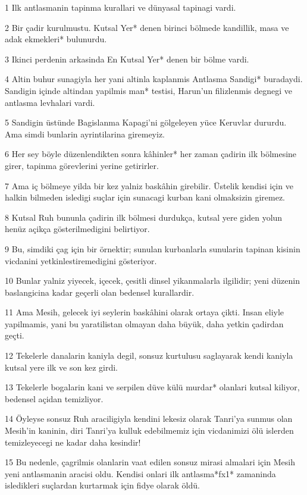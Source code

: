 \par 1 Ilk antlasmanin tapinma kurallari ve dünyasal tapinagi vardi.
\par 2 Bir çadir kurulmustu. Kutsal Yer* denen birinci bölmede kandillik, masa ve adak ekmekleri* bulunurdu.
\par 3 Ikinci perdenin arkasinda En Kutsal Yer* denen bir bölme vardi.
\par 4 Altin buhur sunagiyla her yani altinla kaplanmis Antlasma Sandigi* buradaydi. Sandigin içinde altindan yapilmis man* testisi, Harun'un filizlenmis degnegi ve antlasma levhalari vardi.
\par 5 Sandigin üstünde Bagislanma Kapagi'ni gölgeleyen yüce Keruvlar dururdu. Ama simdi bunlarin ayrintilarina giremeyiz.
\par 6 Her sey böyle düzenlendikten sonra kâhinler* her zaman çadirin ilk bölmesine girer, tapinma görevlerini yerine getirirler.
\par 7 Ama iç bölmeye yilda bir kez yalniz baskâhin girebilir. Üstelik kendisi için ve halkin bilmeden isledigi suçlar için sunacagi kurban kani olmaksizin giremez.
\par 8 Kutsal Ruh bununla çadirin ilk bölmesi durdukça, kutsal yere giden yolun henüz açikça gösterilmedigini belirtiyor.
\par 9 Bu, simdiki çag için bir örnektir; sunulan kurbanlarla sunularin tapinan kisinin vicdanini yetkinlestiremedigini gösteriyor.
\par 10 Bunlar yalniz yiyecek, içecek, çesitli dinsel yikanmalarla ilgilidir; yeni düzenin baslangicina kadar geçerli olan bedensel kurallardir.
\par 11 Ama Mesih, gelecek iyi seylerin baskâhini olarak ortaya çikti. Insan eliyle yapilmamis, yani bu yaratilistan olmayan daha büyük, daha yetkin çadirdan geçti.
\par 12 Tekelerle danalarin kaniyla degil, sonsuz kurtulusu saglayarak kendi kaniyla kutsal yere ilk ve son kez girdi.
\par 13 Tekelerle bogalarin kani ve serpilen düve külü murdar* olanlari kutsal kiliyor, bedensel açidan temizliyor.
\par 14 Öyleyse sonsuz Ruh araciligiyla kendini lekesiz olarak Tanri'ya sunmus olan Mesih'in kaninin, diri Tanri'ya kulluk edebilmemiz için vicdanimizi ölü islerden temizleyecegi ne kadar daha kesindir!
\par 15 Bu nedenle, çagrilmis olanlarin vaat edilen sonsuz mirasi almalari için Mesih yeni antlasmanin aracisi oldu. Kendisi onlari ilk antlasma*fx1* zamaninda isledikleri suçlardan kurtarmak için fidye olarak öldü.
